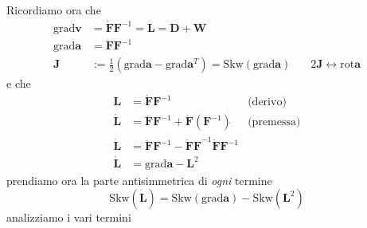 \documentclass[10pt,a4paper,twoside]{book}
\begin{document}
Ricordiamo ora che
\begin{equation*}
\begin{aligned}
\mathrm{grad}\mathbf{v} & =\dot{\mathbf{F}}\mathbf{F}^{-1} =\mathbf{L} =\mathbf{D} +\mathbf{W}\\
\mathrm{grad}\mathbf{a} & =\ddot{\mathbf{F}}\mathbf{F}^{-1}\\
\mathbf{J} & :=\frac{1}{2}\left(\mathrm{grad}\mathbf{a} -\mathrm{grad}\mathbf{a}^{T}\right) =\mathrm{Skw}(\mathrm{grad}\mathbf{a}) \ \ \ \ \ \ \ \ 2\mathbf{J} \leftrightarrow \mathrm{rot}\mathbf{a}
\end{aligned}
\end{equation*}
e che
\begin{equation*}
\begin{aligned}
\mathbf{L} & =\dot{\mathbf{F}}\mathbf{F}^{-1} & \text{(derivo)}\\
\dot{\mathbf{L}} & =\ddot{\mathbf{F}}\mathbf{F}^{-1} +\dot{\mathbf{F}}\left(\mathbf{F}^{-1}\right)\dot{} & \text{(premessa)}\\
\dot{\mathbf{L}} & =\ddot{\mathbf{F}}\mathbf{F}^{-1} -\mathbf{\dot{\mathbf{F}} F}^{-1}\dot{\mathbf{F}}\mathbf{F}^{-1} & \\
\dot{\mathbf{L}} & =\mathrm{grad}\mathbf{a} -\mathbf{L}^{2} & 
\end{aligned}
\end{equation*}
prendiamo ora la parte antisimmetrica di \textit{ogni} termine
\begin{equation*}
\mathrm{Skw}(\dot{\mathbf{L}}) =\mathrm{Skw}(\mathrm{grad}\mathbf{a}) -\mathrm{Skw}\left(\mathbf{L}^{2}\right)
\end{equation*}
analizziamo i vari termini
\end{document}
